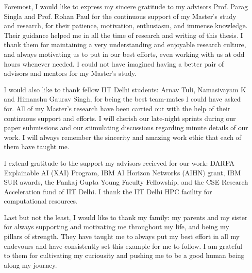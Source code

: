 Foremost, I would like to express my sincere gratitude to my advisors Prof. Parag Singla and Prof. Rohan Paul for the continuous support of my Master's study and research, for their patience, motivation, enthusiasm, and immense knowledge. Their guidance helped me in all the time of research and writing of this thesis. I thank them for maintaining a very understanding and enjoyable research culture, and always motivating us to put in our best efforts, even working with us at odd hours whenever needed. I could not have imagined having a better pair of advisors and mentors for my Master's study.

I would also like to thank fellow IIT Delhi students: Arnav Tuli, Namasivayam K and Himanshu Gaurav Singh, for being the best team-mates I could have asked for. All of my Master's research have been carried out with the help of their continuous support and efforts. I will cherish our late-night sprints during our paper submissions and our stimulating discussions regarding minute details of our work. I will always remember the sincerity and amazing work ethic that each of them have taught me.

I extend gratitude to the support my advisors recieved for our work: DARPA Explainable AI (XAI)
Program, IBM AI Horizon Networks (AIHN) grant, IBM SUR awards, the Pankaj Gupta
Young Faculty Fellowship, and the CSE Research Acceleration fund of IIT Delhi. I thank the IIT Delhi HPC facility for computational resources.

Last but not the least, I would like to thank my family: my parents and my sister for always supporting and motivating me throughout my life, and being my pillars of strength. They have taught me to always put my best effort in all my endevours and have consistently set this example for me to follow. I am grateful to them for cultivating my curiousity and pushing me to be a good human being along my journey.